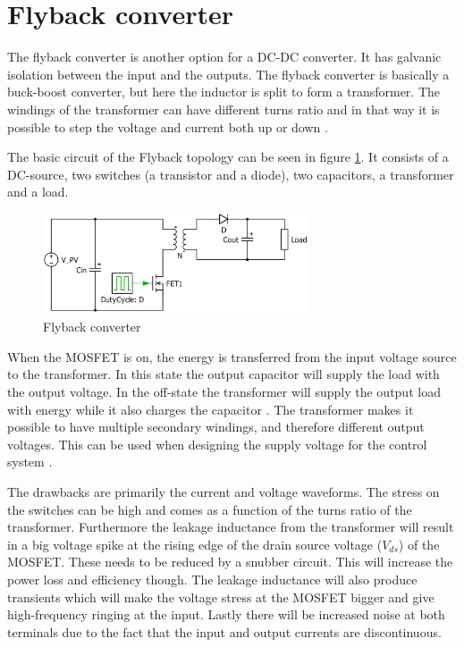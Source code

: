 \section{Flyback converter}

The flyback converter is another option for a DC-DC converter. It has galvanic isolation between the input and the outputs. The flyback converter is basically a buck-boost converter, but here the inductor is split to form a transformer. The windings of the transformer can have different turns ratio and in that way it is possible to step the voltage and current both up or down \cite{flyback}. 

The basic circuit of the Flyback topology can be seen in figure \ref{Flyback_SCHEMATIC}. It consists of a DC-source, two switches (a transistor and a diode), two capacitors, a transformer and a load.    

\begin{figure}[H]
	\begin{center}
	\includegraphics[width=0.7\textwidth]{../Pictures/flyback_schem.png}
	\caption{Flyback converter}
	\label{Flyback_SCHEMATIC}
	\end{center}
\end{figure}

When the MOSFET is on, the energy is transferred from the input voltage source to the transformer. In this state the output capacitor will supply the load with the output voltage. In the off-state the transformer will supply the output load with energy while it also charges the capacitor \cite{flyback}. 
The transformer makes it possible to have multiple secondary windings, and therefore different output voltages. This can be used when designing the supply voltage for the control system \cite{flyback}.

  

The drawbacks are primarily the current and voltage waveforms. The stress on the switches can be high and comes as a function of the turns ratio of the transformer. Furthermore the leakage inductance from the transformer will result in a big voltage spike at the rising edge of the drain source voltage ($V_{ds}$) of the MOSFET. These needs to be reduced by a snubber circuit. This will increase the power loss and efficiency though. The leakage inductance will also produce transients which will make the voltage stress at the MOSFET bigger and give high-frequency ringing at the input. Lastly there will be increased noise at both terminals due to the fact that the input and output currents are discontinuous\cite{underthehood}.
